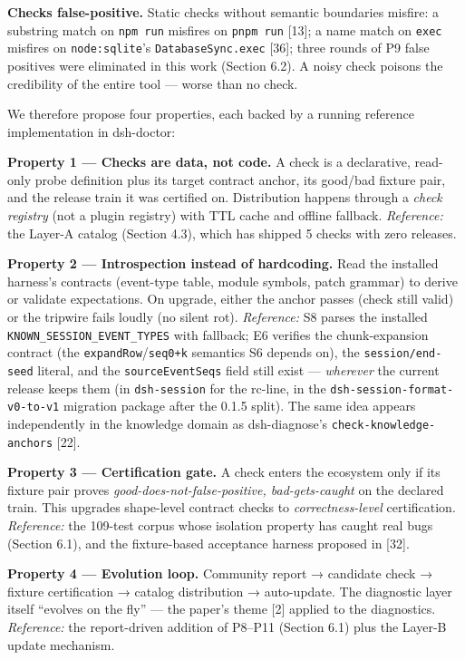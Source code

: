 \documentclass[
]{article}
\begin{document}
\textbf{Checks false-positive.} Static checks without semantic
boundaries misfire: a substring match on \texttt{npm\ run} misfires on
\texttt{pnpm\ run} {[}13{]}; a name match on \texttt{exec} misfires on
\texttt{node:sqlite}'s \texttt{DatabaseSync.exec} {[}36{]}; three rounds
of P9 false positives were eliminated in this work (Section 6.2). A
noisy check poisons the credibility of the entire tool --- worse than no
check.

We therefore propose four properties, each backed by a running reference
implementation in dsh-doctor:

\textbf{Property 1 --- Checks are data, not code.} A check is a
declarative, read-only probe definition plus its target contract anchor,
its good/bad fixture pair, and the release train it was certified on.
Distribution happens through a \emph{check registry} (not a plugin
registry) with TTL cache and offline fallback. \emph{Reference:} the
Layer-A catalog (Section 4.3), which has shipped 5 checks with zero
releases.

\textbf{Property 2 --- Introspection instead of hardcoding.} Read the
installed harness's contracts (event-type table, module symbols, patch
grammar) to derive or validate expectations. On upgrade, either the
anchor passes (check still valid) or the tripwire fails loudly (no
silent rot). \emph{Reference:} S8 parses the installed
\texttt{KNOWN\_SESSION\_EVENT\_TYPES} with fallback; E6 verifies
the chunk-expansion contract (the \texttt{expandRow}/\texttt{seq0+k}
semantics S6 depends on), the \texttt{session/end-seed} literal, and the
\texttt{sourceEventSeqs} field still exist --- \emph{wherever} the current
release keeps them (in \texttt{dsh-session} for the rc-line, in the
\texttt{dsh-session-format-v0-to-v1} migration package after the 0.1.5 split). The same idea appears
independently in the knowledge domain as dsh-diagnose's
\texttt{check-knowledge-anchors} {[}22{]}.

\textbf{Property 3 --- Certification gate.} A check enters the ecosystem
only if its fixture pair proves \emph{good-does-not-false-positive,
bad-gets-caught} on the declared train. This upgrades shape-level
contract checks to \emph{correctness-level} certification.
\emph{Reference:} the 109-test corpus whose isolation property has caught
real bugs (Section 6.1), and the fixture-based acceptance harness
proposed in {[}32{]}.

\textbf{Property 4 --- Evolution loop.} Community report → candidate
check → fixture certification → catalog distribution → auto-update. The
diagnostic layer itself ``evolves on the fly'' --- the paper's theme
{[}2{]} applied to the diagnostics. \emph{Reference:} the report-driven
addition of P8--P11 (Section 6.1) plus the Layer-B update mechanism.
\end{document}
